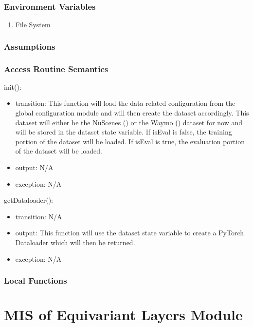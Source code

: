\documentclass[12pt, titlepage]{article}
\begin{document}
\subsubsection{Environment Variables}
\begin{enumerate}
  \item File System
\end{enumerate}

\subsubsection{Assumptions}



\subsubsection{Access Routine Semantics}
\noindent init():
\begin{itemize}
\item transition: This function will load the data-related configuration from the global configuration module and will then create the dataset accordingly.
This dataset will either be the NuScenes (\cite{caesar2020nuscenes}) or the Waymo (\cite{sun2020scalability}) dataset for now and will be stored in the dataset state variable. If isEval is false,
the training portion of the dataset will be loaded. If isEval is true, the evaluation portion of the dataset will be loaded.
\item output: N/A
\item exception: N/A
\end{itemize}

\noindent getDataloader():
\begin{itemize}
  \item transition: N/A
  \item output: This function will use the dataset state variable to create a PyTorch Dataloader which will then be returned.
  \item exception: N/A
\end{itemize}

\subsubsection{Local Functions}

\newpage

\section{MIS of Equivariant Layers Module} \label{ModuleEQ} 
\end{document}
